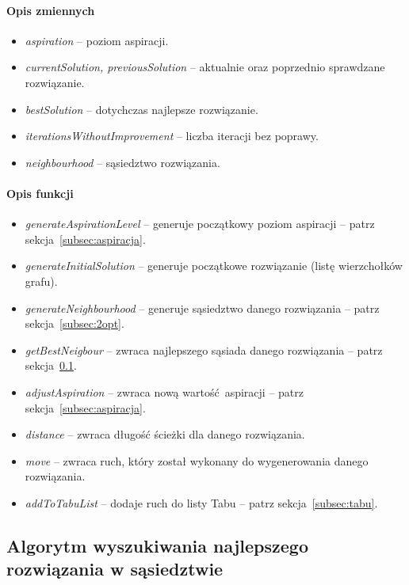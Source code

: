 \documentclass[11pt,a4paper]{article}
\begin{document}
\paragraph{Opis zmiennych}
\begin{itemize}
  \item \textit{aspiration} -- poziom aspiracji.
  \item \textit{currentSolution, previousSolution} -- aktualnie oraz poprzednio sprawdzane rozwiązanie.
  \item \textit{bestSolution} -- dotychczas najlepsze rozwiązanie.
  \item \textit{iterationsWithoutImprovement} -- liczba iteracji bez poprawy.
  \item \textit{neighbourhood} -- sąsiedztwo rozwiązania.
\end{itemize}

\paragraph{Opis funkcji}
\begin{itemize}
  \item \textit{generateAspirationLevel} -- generuje początkowy poziom aspiracji -- patrz sekcja~\ref{subsec:aspiracja}.
  \item \textit{generateInitialSolution} -- generuje początkowe rozwiązanie (listę wierzchołków grafu).
  \item \textit{generateNeighbourhood} -- generuje sąsiedztwo danego rozwiązania -- patrz sekcja~\ref{subsec:2opt}.
  \item \textit{getBestNeigbour} -- zwraca najlepszego sąsiada danego rozwiązania -- patrz sekcja~\ref{subsec:aspirationPlus}.
  \item \textit{adjustAspiration} -- zwraca nową wartość aspiracji -- patrz sekcja~\ref{subsec:aspiracja}.
  \item \textit{distance} -- zwraca długość ścieżki dla danego rozwiązania.
  \item \textit{move} -- zwraca ruch, który został wykonany do wygenerowania danego rozwiązania.
  \item \textit{addToTabuList} -- dodaje ruch do listy Tabu -- patrz sekcja~\ref{subsec:tabu}.
\end{itemize}

\subsection{Algorytm wyszukiwania najlepszego rozwiązania w sąsiedztwie}
\label{subsec:aspirationPlus}
\end{document}

